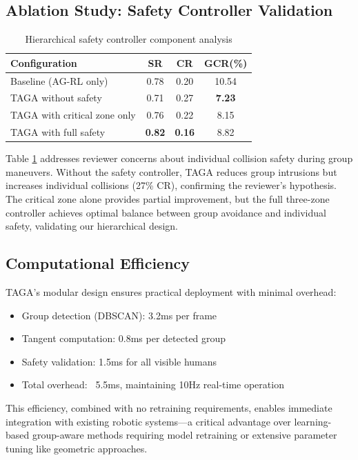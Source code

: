 \subsection{Ablation Study: Safety Controller Validation}

\begin{table}[t]
\caption{Hierarchical safety controller component analysis}
\label{table:ablation}
\centering
\small
\begin{tabular}{lccc}
\hline
\textbf{Configuration} & \textbf{SR} & \textbf{CR} & \textbf{GCR(\%)} \\
\hline
Baseline (AG-RL only) & 0.78 & 0.20 & 10.54 \\
TAGA without safety & 0.71 & 0.27 & \textbf{7.23} \\
TAGA with critical zone only & 0.76 & 0.22 & 8.15 \\
TAGA with full safety & \textbf{0.82} & \textbf{0.16} & 8.82 \\
\hline
\end{tabular}
\end{table}

Table \ref{table:ablation} addresses reviewer concerns about individual collision safety during group maneuvers. Without the safety controller, TAGA reduces group intrusions but increases individual collisions (27\% CR), confirming the reviewer's hypothesis. The critical zone alone provides partial improvement, but the full three-zone controller achieves optimal balance between group avoidance and individual safety, validating our hierarchical design.

\subsection{Computational Efficiency}

TAGA's modular design ensures practical deployment with minimal overhead:
\begin{itemize}
\item Group detection (DBSCAN): 3.2ms per frame
\item Tangent computation: 0.8ms per detected group  
\item Safety validation: 1.5ms for all visible humans
\item Total overhead: ~5.5ms, maintaining 10Hz real-time operation
\end{itemize}

This efficiency, combined with no retraining requirements, enables immediate integration with existing robotic systems—a critical advantage over learning-based group-aware methods requiring model retraining or extensive parameter tuning like geometric approaches.


